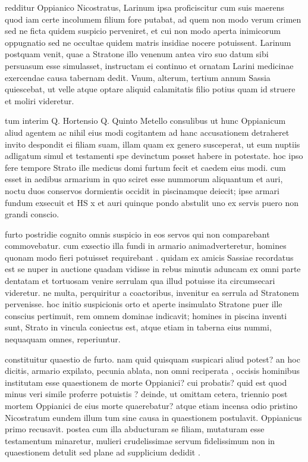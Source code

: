  redditur Oppianico Nicostratus, Larinum ipsa proficiscitur cum suis maerens quod iam certe incolumem filium fore putabat, ad quem non modo verum crimen sed ne ficta quidem suspicio perveniret, et cui non modo aperta inimicorum oppugnatio sed ne occultae quidem matris insidiae nocere potuissent. Larinum postquam venit, quae a Stratone illo venenum antea viro suo datum sibi persuasum esse simulasset, instructam ei continuo et ornatam Larini medicinae exercendae causa tabernam dedit. Vnum, alterum, tertium annum Sassia quiescebat, ut velle atque optare aliquid calamitatis filio potius quam id struere et moliri videretur.

 tum interim Q. Hortensio Q. Quinto Metello consulibus ut hunc Oppianicum aliud agentem ac nihil eius modi cogitantem ad hanc accusationem detraheret invito despondit ei filiam suam, illam quam ex genero susceperat, ut eum nuptiis adligatum simul et testamenti spe devinctum posset habere in potestate. hoc ipso fere tempore Strato ille medicus domi furtum fecit et caedem eius modi. cum esset in aedibus armarium in quo sciret esse nummorum aliquantum et auri, noctu duos conservos dormientis occidit in piscinamque deiecit; ipse armari fundum exsecuit et HS x et auri quinque pondo abstulit uno ex servis puero non grandi conscio.

 furto postridie cognito omnis suspicio in eos servos qui non comparebant commovebatur. cum exsectio illa fundi in armario animadverteretur, homines quonam modo fieri potuisset requirebant . quidam ex amicis Sassiae recordatus est se nuper in auctione quadam vidisse in rebus minutis aduncam ex omni parte dentatam et tortuosam venire serrulam qua illud potuisse ita circumsecari videretur. ne multa, perquiritur a coactoribus, invenitur ea serrula ad Stratonem pervenisse. hoc initio suspicionis orto et aperte insimulato Stratone puer ille conscius pertimuit, rem omnem dominae indicavit; homines in piscina inventi sunt, Strato in vincula coniectus est, atque etiam in taberna eius nummi, nequaquam omnes, reperiuntur.

 constituitur quaestio de furto. nam quid quisquam suspicari aliud potest? an hoc dicitis, armario expilato, pecunia ablata, non omni reciperata , occisis hominibus institutam esse quaestionem de morte Oppianici? cui probatis? quid est quod minus veri simile proferre potuistis ? deinde, ut omittam cetera, triennio post mortem Oppianici de eius morte quaerebatur? atque etiam incensa odio pristino Nicostratum eundem illum tum sine causa in quaestionem postulavit. Oppianicus primo recusavit. postea cum illa abducturam se filiam, mutaturam esse testamentum minaretur, mulieri crudelissimae servum fidelissimum non in quaestionem detulit sed plane ad supplicium dedidit .


